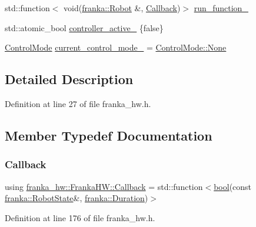 \begin{DoxyCompactItemize}
\item 
std\+::function$<$ void(\hyperlink{classfranka_1_1Robot}{franka\+::\+Robot} \&, \hyperlink{classfranka__hw_1_1FrankaHW_ac576bd5140a03864888c68519daa5aa4}{Callback})$>$ \hyperlink{classfranka__hw_1_1FrankaHW_ab53d17aecdb62936defdcde99e9b88b8}{run\+\_\+function\+\_\+}
\item 
std\+::atomic\+\_\+bool \hyperlink{classfranka__hw_1_1FrankaHW_aa207ee4ba133fdb1b3887c9639b47b40}{controller\+\_\+active\+\_\+} \{false\}
\item 
\hyperlink{namespacefranka__hw_afa416558ce4baace5ac6c71bd5d2c98c}{Control\+Mode} \hyperlink{classfranka__hw_1_1FrankaHW_a4eb4ed0043449742cadefa5809d9c6f0}{current\+\_\+control\+\_\+mode\+\_\+} = \hyperlink{namespacefranka__hw_afa416558ce4baace5ac6c71bd5d2c98ca6adf97f83acf6453d4a6a4b1070f3754}{Control\+Mode\+::\+None}
\end{DoxyCompactItemize}


\subsection{Detailed Description}


Definition at line 27 of file franka\+\_\+hw.\+h.



\subsection{Member Typedef Documentation}
\mbox{\label{classfranka__hw_1_1FrankaHW_ac576bd5140a03864888c68519daa5aa4}} 
\subsubsection{\texorpdfstring{Callback}{Callback}}
{\footnotesize\ttfamily using \hyperlink{classfranka__hw_1_1FrankaHW_ac576bd5140a03864888c68519daa5aa4}{franka\+\_\+hw\+::\+Franka\+H\+W\+::\+Callback} =  std\+::function$<$\hyperlink{classbool}{bool}(const \hyperlink{structfranka_1_1RobotState}{franka\+::\+Robot\+State}\&, \hyperlink{classfranka_1_1Duration}{franka\+::\+Duration})$>$\hspace{0.3cm}{\ttfamily [private]}}



Definition at line 176 of file franka\+\_\+hw.\+h.



